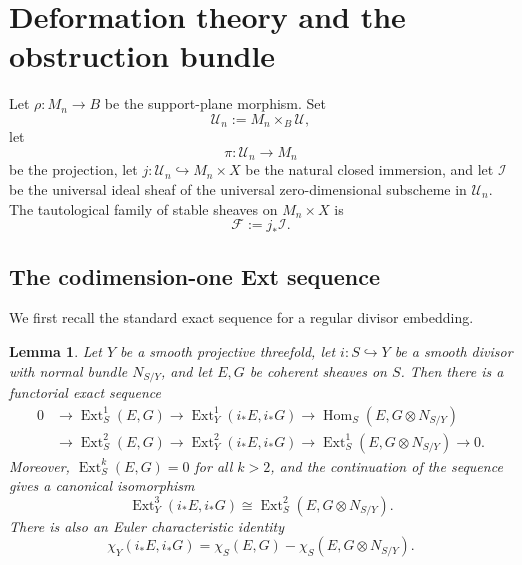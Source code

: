 \documentclass[12pt]{amsart}
\numberwithin{equation}{section}
\newcommand{\Ext}{\operatorname{Ext}}
\newcommand{\Hom}{\operatorname{Hom}}
\theoremstyle{plain}
\newtheorem{lemma}[theorem]{Lemma}
\theoremstyle{definition}
\theoremstyle{remark}
\begin{document}
\section{Deformation theory and the obstruction bundle}\label{sec:obstruction}

Let $\rho\colon M_n\to B$ be the support-plane morphism.
Set
\[
\mathcal U_n:=M_n\times_B\mathcal U,
\]
let
\[
\pi\colon \mathcal U_n\to M_n
\]
be the projection, let $j\colon \mathcal U_n\hookrightarrow M_n\times X$ be the natural closed immersion, and let $\mathcal I$ be the universal ideal sheaf of the universal zero-dimensional subscheme in $\mathcal U_n$.
The tautological family of stable sheaves on $M_n\times X$ is
\[
\mathcal F:=j_*\mathcal I.
\]

\subsection{The codimension-one Ext sequence}
We first recall the standard exact sequence for a regular divisor embedding.

\begin{lemma}\label{lem:ext-sequence}
Let $Y$ be a smooth projective threefold, let $i\colon S\hookrightarrow Y$ be a smooth divisor with normal bundle $N_{S/Y}$, and let $E,G$ be coherent sheaves on $S$.
Then there is a functorial exact sequence
\begin{align*}
0 &\to \Ext^1_S(E,G)
\to \Ext^1_Y(i_*E,i_*G)
\to \Hom_S(E,G\otimes N_{S/Y}) \\
&\to \Ext^2_S(E,G)
\to \Ext^2_Y(i_*E,i_*G)
\to \Ext^1_S(E,G\otimes N_{S/Y}) \to 0.
\end{align*}
Moreover, $\Ext^k_S(E,G)=0$ for all $k>2$, and the continuation of the sequence gives a canonical isomorphism
\[
\Ext^3_Y(i_*E,i_*G)\cong \Ext^2_S(E,G\otimes N_{S/Y}).
\]
There is also an Euler characteristic identity
\begin{equation}\label{eq:chi-general}
\chi_Y(i_*E,i_*G)=\chi_S(E,G)-\chi_S(E,G\otimes N_{S/Y}).
\end{equation}
\end{lemma}
\end{document}
